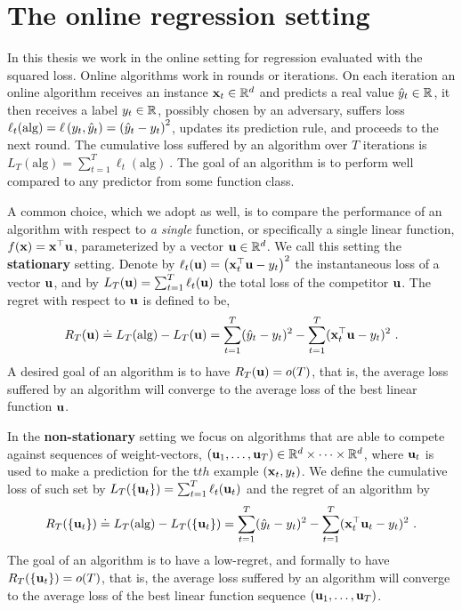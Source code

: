 \chapter{The online regression setting}

In this thesis we work in the online setting for regression evaluated with the
squared loss. Online algorithms work in rounds or iterations. On each
iteration an online algorithm receives an instance
$\mathbf{x}_{t}\in\mathbb{R}^d$ and predicts a real value $\hat{y}_{t}\in\mathbb{R}$, it
then receives a label $y_{t}\in\mathbb{R}$, possibly chosen by an
adversary, suffers loss $\ell_t(\textrm{alg})=\ell\left({ y_{t},
  \hat{y}_{t} }\right) = \left({\hat{y}_{t}- y_{t} }\right)^2$, updates its prediction
rule, and proceeds to the next round. The cumulative loss suffered by
an algorithm over $T$ iterations is
\(
L_{T}(\textrm{alg})=\sum_{t=1}^{T}\ell_{t}(\textrm{alg})
~.
\)
The goal of an algorithm is to perform well compared to any predictor
from some function class.

A common choice, which we adopt as well, is to compare the performance of an algorithm with respect to {\em a single} function, or specifically a single
linear function,  $f(\mathbf{x})={\mathbf{x}}^{\top}\mathbf{u}$, parameterized by a vector
$\mathbf{u}\in\mathbb{R}^d$. We call this setting the \textbf{stationary} setting.
Denote by $\ell_t(\mathbf{u}) = \left({{\mathbf{x}}^{\top}_{t}\mathbf{u}-y_{t}}\right)^2$ the instantaneous
loss of a vector $\mathbf{u}$, and by $L_T(\mathbf{u}) = \sum_{t=1}^T
\ell_t(\mathbf{u})$ the total loss of the competitor $\mathbf{u}$.
The regret with respect to $\mathbf{u}$ is defined to be,
\[
R_T(\mathbf{u}) \doteq L_{T}(\textrm{alg}) - L_T(\mathbf{u})= \sum_{t=1}^T (\hat{y}_{t}-y_{t})^2
-  \sum_{t=1}^T ({\mathbf{x}}^{\top}_{t}\mathbf{u}-y_{t})^2 ~.
\]
A desired goal of an algorithm is to have ${R}_T(\mathbf{u}) = o(T)$, that is, the
average loss suffered by an algorithm will converge to the average
loss of the best linear function $\mathbf{u}$.

In the \textbf{non-stationary} setting we focus on algorithms that are able to compete against sequences of
weight-vectors, $(\mathbf{u}_{1} , \ldots , \mathbf{u}_{T})\in \mathbb{R}^d \times \dots
\times \mathbb{R}^d$, where $\mathbf{u}_{t}$ is used to make a prediction for the t$th$ example
$(\mathbf{x}_{t},y_{t})$.
We define the cumulative loss of such set by
\(
L_T( \{\mathbf{u}_{t}\}) = \sum_{t=1}^T \ell_t(\mathbf{u}_{t})
\) and the
  regret of an algorithm by
\[
R_T(\{\mathbf{u}_{t}\}) \doteq L_{T}(\textrm{alg}) - L_T(\{\mathbf{u}_{t}\})
= \sum_{t=1}^T (\hat{y}_{t}-y_{t})^2 - \sum_{t=1}^T ({\mathbf{x}}^{\top}_{t}\mathbf{u}_{t}-y_{t})^2~.
\]
The goal of an algorithm is to have a low-regret, and formally to have ${R}_T(\{\mathbf{u}_{t}\}) = o(T)$, that is, the
average loss suffered by an algorithm will converge to the average
loss of the best linear function sequence $(\mathbf{u}_{1} , \ldots , \mathbf{u}_{T})$.

